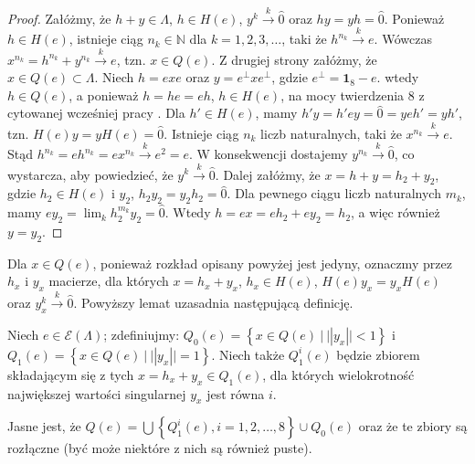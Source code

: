 {\begin{proof}
    Załóżmy, że $h + y \in \Lambda$, $h \in H(e)$, $y^{k}  \overset{k}{\rightarrow}  \hat{0}$
    oraz $hy = yh = \hat{0}$.
Ponieważ $h \in H(e)$, istnieje ciąg $n_{k} \in \mathbb{N}$ dla $k =1,2,3,\ldots$,
taki że $h^{n_{k}} \overset{k}{\rightarrow} e$.
Wówczas $x^{n_{k}}  = h^{n_{k}} + y^{n_{k}}  \overset{k}{\rightarrow}  e$, tzn.
    $x \in Q(e)$.
Z drugiej strony
załóżmy, że $x \in Q(e) \subset \Lambda$.
Niech $h = e x e$ oraz $y = e^{\perp} x e^{\perp}$,
gdzie $e^{\perp} = \mathbf{1}_{8} - e$.
wtedy $h \in Q(e)$, a ponieważ
    $h =  h e = e h$,
    $h \in H(e)$, na mocy twierdzenia 8 z cytowanej wcześniej pracy
    \cite{schwarz1955hausdorff}.
Dla $h' \in H(e)$, mamy
    $h' y = h' e y = \hat{0} = y e h' = yh'$,
tzn. $H(e) y = y H (e) = \hat{0}$.
Istnieje ciąg $n_{k}$ liczb naturalnych, taki że
    $x^{n_{k}}  \overset{k}{\rightarrow}  e$.
Stąd
    $h^{n_{k}} = e h^{n_{k}}  = e x^{n_{k}}  \overset{k}{\rightarrow} e^{2}  = e$.
W konsekwencji dostajemy $y^{n_{k}}  \overset{k}{\rightarrow}  \hat{0}$,
co wystarcza, aby powiedzieć, że $y^{k} \overset{k}{\rightarrow} \hat{0}$.
Dalej załóżmy, że $x = h + y = h_{2} + y_{2}$,
    gdzie $h_{2} \in H(e)$ i $y_{2}$,
    $h_{2} y_{2} = y_{2} h_{2} = \hat{0}$.
Dla pewnego ciągu liczb naturalnych $m_{k}$, mamy
    $e y_{2} = \lim_{k} h_{2}^{m_{k}} y_{2} = \hat{0}$.
Wtedy $h = e x = e h_{2} + e y_{2} = h_{2}$, a więc również $y = y_{2}$.
\end{proof}

Dla $x \in Q(e)$, ponieważ rozkład opisany powyżej jest jedyny,
oznaczmy przez $h_{x}$ i $y_{x}$ macierze, dla których
$x = h_{x} + y_{x}$,
$h_{x} \in H(e)$, $H(e) y_{x} = y_{x} H(e)$ oraz
$y_{x}^{k} \overset{k}{\rightarrow} \hat{0}$.
Powyższy lemat uzasadnia następującą definicję.

\begin{Definition}
    Niech $e \in \mathcal{E}(\Lambda)$;
    zdefiniujmy:
    $Q_{0}(e) = \left \{ x \in Q(e) \: | \: || y_{x} || < 1 \right \}$ i
    $Q_{1}(e) = \left \{ x \in Q(e) \: | \: || y_{x} || = 1 \right \}$.
    Niech także $Q_{1}^{i}(e)$ będzie zbiorem składającym się z tych
    $x = h_{x} + y_{x} \in Q_{1}(e)$,
    dla których wielokrotność największej wartości singularnej $y_{x}$
    jest równa $i$.
\end{Definition}

Jasne jest, że
$Q(e) = \bigcup \left \{ Q_{1}^{i}(e), i=1,2,\ldots,8 \right \} \cup Q_{0}(e)$
oraz że te zbiory są rozłączne (być może niektóre z nich są również puste).

}
